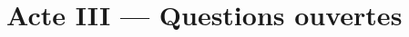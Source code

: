 \documentclass[aspectratio=169]{beamer}
\begin{document}
\section{Acte III — Questions ouvertes}





\end{document}
